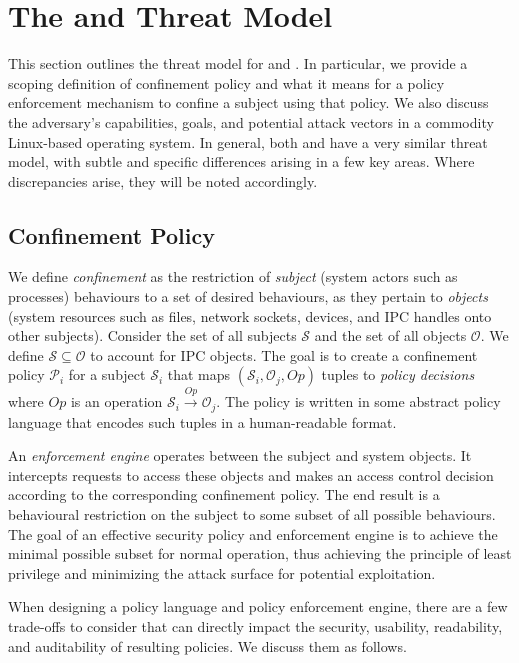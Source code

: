 \section{The \bpfbox{} and \bpfcontain{} Threat Model}%
\label{s:cp-threat-model}

This section outlines the threat model for \bpfbox{} and \bpfcontain{}. In particular, we
provide a scoping definition of confinement policy and what it means for a policy
enforcement mechanism to confine a subject using that policy. We also discuss the
adversary's capabilities, goals, and potential attack vectors in a commodity Linux-based
operating system. In general, both \bpfbox{} and \bpfcontain{} have a very similar threat
model, with subtle and specific differences arising in a few key areas. Where
discrepancies arise, they will be noted accordingly.

\subsection{Confinement Policy}

We define \textit{confinement} as the restriction of \textit{subject} (system actors such
as processes) behaviours to a set of desired behaviours, as they pertain to
\textit{objects} (system resources such as files, network sockets, devices, and IPC
handles onto other subjects). Consider the set of all subjects $\mathcal{S}$ and the set
of all objects $\mathcal{O}$. We define $\mathcal{S} \subseteq \mathcal{O}$ to account for
IPC objects. The goal is to create a confinement policy $\mathcal{P}_i$ for a subject
$\mathcal{S}_i$ that maps $(\mathcal{S}_i, \mathcal{O}_j, Op)$ tuples to \textit{policy
decisions} where $Op$ is an operation $\mathcal{S}_i \xrightarrow{Op} \mathcal{O}_j$.  The
policy is written in some abstract policy language that encodes such tuples in
a human-readable format.

An \textit{enforcement engine} operates between the subject and system objects. It
intercepts requests to access these objects and makes an access control decision according
to the corresponding confinement policy. The end result is a behavioural restriction on
the subject to some subset of all possible behaviours. The goal of an effective security policy
and enforcement engine is to achieve the minimal possible subset for normal operation,
thus achieving the principle of least privilege and minimizing the attack surface for
potential exploitation.

When designing a policy language and policy enforcement engine, there are a few trade-offs
to consider that can directly impact the security, usability, readability, and
auditability of resulting policies. We discuss them as follows.

